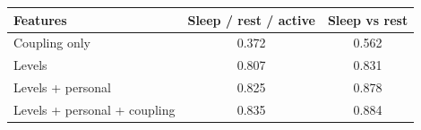 \begin{tabular}{lcc}
\toprule
Features & Sleep / rest / active & Sleep vs rest \\
\midrule
Coupling only & 0.372 & 0.562 \\
Levels & 0.807 & 0.831 \\
Levels + personal & 0.825 & 0.878 \\
Levels + personal + coupling & 0.835 & 0.884 \\
\bottomrule
\end{tabular}
